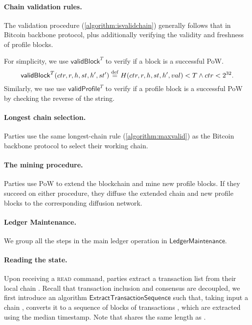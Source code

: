 

\paragraph{Chain validation rules.}
%
The validation procedure (\cref{algorithm:isvalidchain}) generally follows that in Bitcoin backbone protocol, plus additionally verifying the validity and freshness of profile blocks.

For simplicity, we use $\mathsf{validBlock}^T$ to verify if a block is a successful PoW.
%
\[ \mathsf{validBlock}^T(ctr, r, h, st, h', st') \overset{\mathrm{def}}{=} H(ctr, r, h, st, h', val) < T \wedge ctr < 2^{32} .\]
%
Similarly, we use use $\mathsf{validProfile}^T$ to verify if a profile block is a successful PoW by checking the reverse of the string.



\paragraph{Longest chain selection.}
%
Parties use the same longest-chain rule (\cref{algorithm:maxvalid}) as the Bitcoin backbone protocol to select their working chain.



\paragraph{The mining procedure.}
%
Parties use \twoforone PoW to extend the blockchain and mine new profile blocks.
%
If they succeed on either procedure, they diffuse the extended chain and new profile blocks to the corresponding diffusion network.



\paragraph{Ledger Maintenance.}
%
We group all the steps in the main ledger operation in $\mathsf{LedgerMaintenance}$.



\paragraph{Reading the state.}
%
Upon receiving a \textsc{read} command, parties extract a transaction list from their local chain \chainLocal.
%
Recall that transaction inclusion and consensus are decoupled, we first introduce an algorithm $\mathsf{ExtractTransactionSequence}$ such that, taking input a chain \chain, converts it to a sequence of blocks of transactions \txSeqProposal, which are extracted using the median timestamp.
%
Note that \txSeqProposal shares the same length as \chain.

